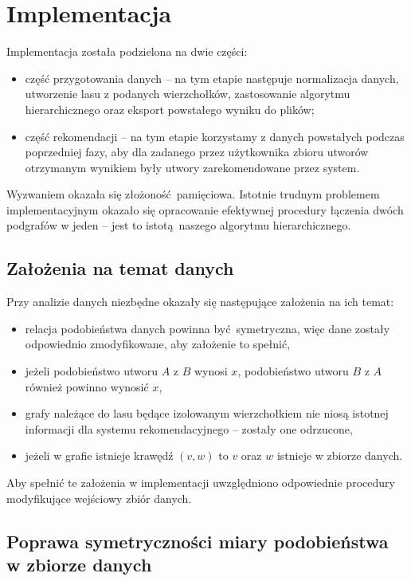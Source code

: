 \documentclass[a4paper,10pt]{article}
\begin{document}
\section{Implementacja}

Implementacja została podzielona na dwie części:
\begin{itemize}
 \item część przygotowania danych -- na tym etapie następuje normalizacja danych, 
	utworzenie lasu z podanych wierzchołków, zastosowanie algorytmu hierarchicznego oraz eksport powstałego wyniku do plików;
 \item część rekomendacji -- na tym etapie korzystamy z danych powstałych podczas poprzedniej fazy, 
	aby dla zadanego przez użytkownika zbioru utworów otrzymanym wynikiem były utwory zarekomendowane przez system.
\end{itemize}

Wyzwaniem okazała się złożoność pamięciowa. 
Istotnie trudnym problemem implementacyjnym okazało się opracowanie efektywnej procedury łączenia dwóch podgrafów w jeden -- 
jest to istotą naszego algorytmu hierarchicznego.

\subsection{Założenia na temat danych}

Przy analizie danych niezbędne okazały się następujące założenia na ich temat:
\begin{itemize}
 \item relacja podobieństwa danych powinna być symetryczna, więc dane zostały odpowiednio zmodyfikowane, aby założenie to spełnić,
 \item jeżeli podobieństwo utworu $A$ z $B$ wynosi $x$, podobieństwo utworu $B$ z $A$ również powinno wynosić $x$,
 \item grafy należące do lasu będące izolowanym wierzchołkiem nie niosą istotnej informacji dla systemu rekomendacyjnego -- zostały one odrzucone,
 \item jeżeli w grafie istnieje krawędź $\left(v, w\right)$ to $v$ oraz $w$ istnieje w zbiorze danych.
\end{itemize}

Aby spełnić te założenia w implementacji uwzględniono odpowiednie procedury modyfikujące wejściowy zbiór danych.

\subsection{Poprawa symetryczności miary podobieństwa w zbiorze danych}
\end{document}
